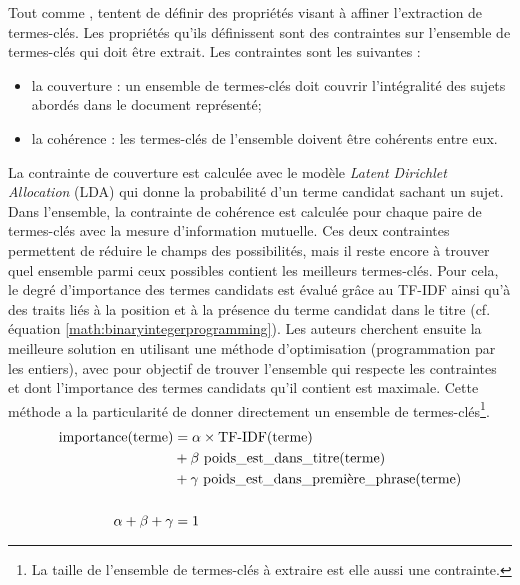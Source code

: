         Tout comme \citet{tomokiyo2003languagemodel},
        \citet{ding2011binaryintegerprogramming} tentent de définir des propriétés
        visant à affiner l'extraction de termes-clés. Les propriétés qu'ils
        définissent sont des contraintes sur l'ensemble de termes-clés qui doit
        être extrait. Les contraintes sont les suivantes :
        \begin{itemize}
          \item{la couverture : un ensemble de termes-clés doit couvrir
                l'intégralité des sujets abordés dans le document
                représenté;}
          \item{la cohérence : les termes-clés de l'ensemble doivent être
                cohérents entre eux.}
        \end{itemize}
        La contrainte de couverture est calculée avec le modèle \textit{Latent
        Dirichlet Allocation} (LDA) \citep{blei2003lda} qui donne la probabilité
        d'un terme candidat sachant un sujet. Dans l'ensemble, la contrainte de
        cohérence est calculée pour chaque paire de termes-clés avec la mesure
        d'information mutuelle. Ces deux contraintes permettent de réduire le
        champs des possibilités, mais il reste encore à trouver quel ensemble
        parmi ceux possibles contient les meilleurs termes-clés. Pour cela, le
        degré d'importance des termes candidats est évalué grâce au TF-IDF ainsi
        qu'à des traits liés à la position et à la présence du terme candidat dans le titre
        (cf. équation \ref{math:binaryintegerprogramming}). Les auteurs cherchent
        ensuite la meilleure solution en utilisant une méthode d'optimisation
        (programmation par les entiers), avec pour objectif de trouver l'ensemble
        qui respecte les contraintes et dont l'importance des termes candidats
        qu'il contient est maximale. Cette méthode a la particularité de donner
        directement un ensemble de termes-clés\footnote{La taille de l'ensemble de
        termes-clés à extraire est elle aussi une contrainte.}.
        \begin{align}
          \text{importance}(\text{terme}) &= \alpha \times \text{TF-IDF}(\text{terme}) \notag\\
                            &+ \beta\ \text{poids\_est\_dans\_titre}(\text{terme}) \notag\\
                            &+ \gamma\ \text{poids\_est\_dans\_première\_phrase}(\text{terme}) \label{math:binaryintegerprogramming}\\
          \notag\\
          \alpha + \beta + \gamma &= 1 \notag
        \end{align}


